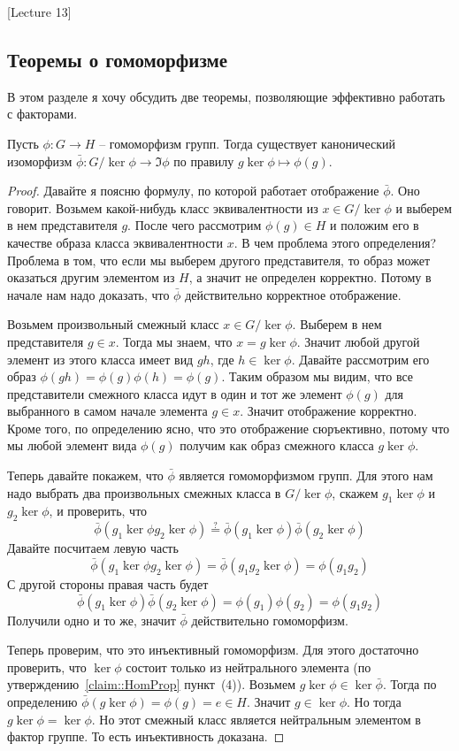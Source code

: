 [Lecture 13]


\subsection{Теоремы о гомоморфизме}

В этом разделе я хочу обсудить две теоремы, позволяющие эффективно работать с факторами.

\begin{claim}
Пусть $\phi\colon G\to H$ -- гомоморфизм групп.
Тогда существует канонический изоморфизм $\bar \phi \colon G/\ker \phi \to \Im \phi$ по правилу $g\ker \phi \mapsto \phi(g)$.
\end{claim}
\begin{proof}
Давайте я поясню формулу, по которой работает отображение $\bar \phi$.
Оно говорит.
Возьмем какой-нибудь класс эквивалентности из $x\in G/\ker \phi$ и выберем в нем представителя $g$.
После чего рассмотрим $\phi(g)\in H$ и положим его в качестве образа класса эквивалентности $x$.
В чем проблема этого определения?
Проблема в том, что если мы выберем другого представителя, то образ может оказаться другим элементом из $H$, а значит не определен корректно.
Потому в начале нам надо доказать, что $\bar\phi$ действительно корректное отображение.

Возьмем произвольный смежный класс $x\in G/\ker \phi$.
Выберем в нем представителя $g\in x$.
Тогда мы знаем, что $x = g \ker \phi$.
Значит любой другой элемент из этого класса имеет вид $gh$, где $h\in \ker \phi$.
Давайте рассмотрим его образ $\phi(gh) = \phi(g) \phi(h) = \phi(g)$.
Таким образом мы видим, что все представители смежного класса идут в один и тот же элемент $\phi(g)$ для выбранного в самом начале элемента $g\in x$.
Значит отображение корректно.
Кроме того, по определению ясно, что это отображение сюръективно, потому что мы любой элемент вида $\phi(g)$ получим как образ смежного класса $g\ker \phi$.

Теперь давайте покажем, что $\bar \phi$ является гомоморфизмом групп.
Для этого нам надо выбрать два произвольных смежных класса в $G/\ker \phi$, скажем $g_1 \ker \phi$ и $g_2\ker \phi$, и проверить, что
\[
\bar\phi(g_1 \ker \phi g_2 \ker \phi) \stackrel{?}{=} \bar \phi(g_1 \ker \phi) \bar \phi(g_2 \ker \phi)
\]
Давайте посчитаем левую часть
\[
\bar\phi(g_1 \ker \phi g_2 \ker \phi) = \bar\phi(g_1 g_2 \ker \phi) = \phi(g_1g_2)
\]
С другой стороны правая часть будет
\[
\bar \phi(g_1 \ker \phi) \bar \phi(g_2 \ker \phi) = \phi(g_1) \phi(g_2) = \phi(g_1 g_2)
\]
Получили одно и то же, значит $\bar \phi$ действительно гомоморфизм.

Теперь проверим, что это инъективный гомоморфизм.
Для этого достаточно проверить, что $\ker \phi$ состоит только из нейтрального элемента (по утверждению~\ref{claim::HomProp} пункт~(4)).
Возьмем $g\ker \phi \in \ker \bar \phi$.
Тогда по определению $\bar\phi(g \ker \phi) = \phi(g) = e\in H$.
Значит $g\in \ker \phi$.
Но тогда $g\ker \phi = \ker \phi$.
Но этот смежный класс является нейтральным элементом в фактор группе.
То есть инъективность доказана.
\end{proof}

